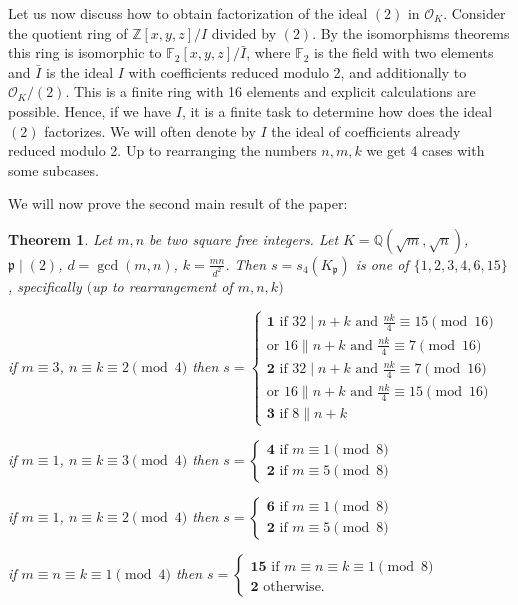 \documentclass[12pt]{article}
\newtheorem{thm}{Theorem}[section]
\theoremstyle{remark}
\newcommand{\OO}{\mathcal{O}}
\begin{document}
Let us now discuss how to obtain factorization of the ideal $(2)$ in $\OO_K$. Consider the quotient ring of $\mathbb{Z}[x,y,z]/I$ divided by $(2)$. By the isomorphisms theorems this ring is isomorphic to $\mathbb{F}_2 [x,y,z]/\bar{I}$, where $\mathbb{F}_2$ is the field with two elements and $\bar{I}$ is the ideal $I$ with coefficients reduced modulo 2, and additionally to $\OO_K/(2)$. This is a finite ring with 16 elements and explicit calculations are possible. Hence, if we have $I$, it is a finite task to determine how does the ideal $(2)$ factorizes. We will often denote by $I$ the ideal of coefficients already reduced modulo 2. Up to rearranging the numbers $n,m,k$ we get 4 cases with some subcases.

We will now prove the second main result of the paper:

\begin{thm}\label{main2} Let $m,n$ be two square free integers. Let $K = \mathbb{Q}(\sqrt{m},\sqrt{n})$, $\mathfrak{p} \mid (2)$, $d = \gcd(m,n)$, $k = \frac{mn}{d^2}$. Then $s = s_4(K_{\mathfrak{p}})$ is one of $\{1,2,3,4,6,15\}$, specifically $($up to rearrangement of $m,n,k)$
\begin{center}
    if $m \equiv 3$, $n\equiv k \equiv 2 \pmod{4}$ then $s = \begin{cases}
        \textbf{1} \text{ if } 32 \mid n+k \text{ and } \frac{nk}{4} \equiv 15 \pmod{16} \\
        \text{or } 16 \parallel n+k \text{ and } \frac{nk}{4} \equiv 7 \pmod{16}\\
        \textbf{2} \text{ if } 32 \mid n+k \text{ and } \frac{nk}{4} \equiv 7 \pmod{16} \\
        \text{or } 16 \parallel n+k \text{ and } \frac{nk}{4} \equiv 15 \pmod{16}\\
        \textbf{3} \text{ if } 8 \parallel n+k
    \end{cases}$
\end{center}
\begin{center}
    if $m \equiv 1$, $n \equiv k \equiv 3 \pmod{4}$ then $s = \begin{cases}
        \textbf{4} \text{ if } m \equiv 1 \pmod{8}\\
        \textbf{2} \text{ if } m \equiv 5 \pmod{8}
    \end{cases}$
\end{center}
\begin{center}
    if $m \equiv 1$, $n \equiv k \equiv 2 \pmod{4}$ then $s = \begin{cases}
        \textbf{6} \text{ if } m \equiv 1 \pmod{8}\\
        \textbf{2} \text{ if } m \equiv 5 \pmod{8}
    \end{cases}$
\end{center}
\begin{center}
    if $m \equiv n \equiv k \equiv 1 \pmod{4}$ then $s = \begin{cases}
        \textbf{15} \text{ if } m \equiv n \equiv k \equiv 1 \pmod{8}\\
        \textbf{2} \text{ otherwise.}
    \end{cases}$
\end{center}
\end{thm}
\end{document}
